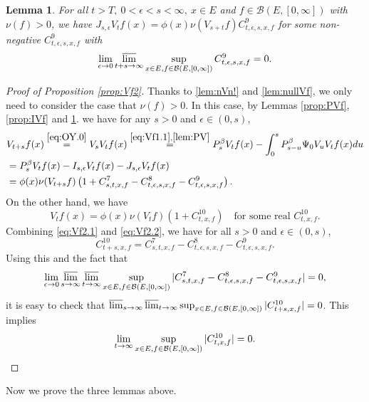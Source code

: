\documentclass[12pt,a4paper]{amsart}
\numberwithin{equation}{section}
\theoremstyle{plain}
\newtheorem{lem}[thm]{Lemma}
\theoremstyle{definition}
\theoremstyle{remark}
\begin{document}
\begin{lem} \label{prop:JVf}
For all $t>T,~0<\epsilon<s< \infty,~x\in E$ and $f\in \mathcal B(E,[0,\infty])$ with $\nu(f)>0$, we have $ J_{s,\epsilon} V_tf(x) = \phi(x) \nu(V_{s+t}f) C^9_{t,\epsilon,s,x,f}$ for some non-negative $C^9_{t,\epsilon,s,x,f}$ with
\[
	\lim_{\epsilon \to 0}\varlimsup_{t+s\to \infty} \sup_{x\in E, f\in \mathcal B(E,[0,\infty])} C^9_{t,\epsilon,s,x,f} =0.
\]
\end{lem}

\begin{proof}[{Proof of Proposition \ref{prop:Vf2}}]
Thanks to \eqref{lem:nVn!} and \eqref{lem:nullVf}, we only need to consider the case that $\nu(f)>0$.
	In this case,
by Lemmas \ref{prop:PVf}, \ref{prop:IVf} and \ref{prop:JVf}.
we have for any $s>0$ and $\epsilon\in (0,s)$,
\begin{align}
	& V_{t+s}f (x)
	\overset{\eqref{eq:OY.0}}= V_s V_t f(x)
	\overset{\eqref{eq:Vf1.1},\eqref{lem:PV}}= P_s^\beta V_t f(x) - \int_0^s P^\beta_{s-u}\Psi_0 V_uV_t f(x) du
	\\&= P_s^\beta V_t f(x) - I_{s,\epsilon} V_tf(x) - J_{s,\epsilon} V_t f(x)
		\\\label{eq:Vf2.1} &=\phi(x)\nu(V_{t+s}f)
		\left( 1+ C^7_{s,t,x,f} - C^8_{t,\epsilon, s, x,f}- C^9_{t,\epsilon,s,x,f}\right).
\end{align}
	On the other hand, we have
\begin{equation}\label{eq:Vf2.2}
	V_{t}f (x)
		= \phi(x) \nu(V_{t}f) (1+ C^{10}_{t,x,f})		\quad \text{for some real $C^{10}_{t,x,f}$}.
\end{equation}
	Combining \eqref{eq:Vf2.1} and \eqref{eq:Vf2.2}, we have for all $s>0$ and $\epsilon \in (0,s)$,
\[
	C^{10}_{t+s,x,f} = C^{7}_{s,t,x,f} - C^{8}_{t,\epsilon, s, x,f}- C^{9}_{t,\epsilon,s,x,f}.
\]
	 Using this and the fact that
\[
	\lim_{\epsilon \to 0}\varlimsup_{s\to \infty}\varlimsup_{t\to \infty}
	\sup_{x\in E, f\in \mathcal B(E,[0,\infty])}
	|C^7_{s,t,x,f} - C^8_{t,\epsilon, s, x,f}- C^9_{t,\epsilon,s,x,f}|=0,
\]
	it is easy to check that $\varlimsup_{s\to \infty}\varlimsup_{t\to \infty} \sup_{x\in E, f\in
	\mathcal B(E,[0,\infty])} |C^{10}_{t+s,x,f}|=0$.
	This implies
\[
	\lim_{t\to \infty}
	\sup_{x\in E, f\in \mathcal B(E,[0,\infty])}
	|C^{10}_{t,x,f}|=0.
	\qedhere
\]
\end{proof}

	Now we prove the three lemmas above.
\end{document}
